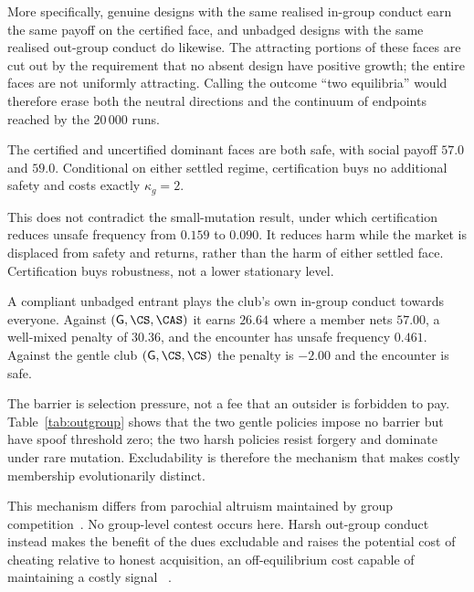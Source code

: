 More specifically, genuine designs with the same realised in-group conduct
earn the same payoff on the certified face, and unbadged designs with the same
realised out-group conduct do likewise. The attracting portions of these faces
are cut out by the requirement that no absent design have positive growth;
the entire faces are not uniformly attracting. Calling the outcome ``two
equilibria'' would therefore erase both the neutral directions and the
continuum of endpoints reached by the $20\,000$ runs.

\begin{corollary}
\label{cor:dues}
The certified and uncertified dominant faces are both safe, with social payoff
$57.0$ and $59.0$. Conditional on either settled regime, certification buys no
additional safety and costs exactly $\kappa_g=2$.
\end{corollary}

This does not contradict the small-mutation result, under which certification
reduces unsafe frequency from $0.159$ to $0.090$. It reduces harm while the
market is displaced from safety and returns, rather than the harm of either
settled face. Certification buys robustness, not a lower stationary level.

\begin{proposition}
\label{prop:exclusion}
A compliant unbadged entrant plays the club's own in-group conduct towards
everyone. Against $(\mathsf{G},\CS,\CAS)$ it earns $26.64$ where a member nets
$57.00$, a well-mixed penalty of $30.36$, and the encounter has unsafe
frequency $0.461$. Against the gentle club $(\mathsf{G},\CS,\CS)$ the penalty
is $-2.00$ and the encounter is safe.
\end{proposition}

The barrier is selection pressure, not a fee that an outsider is forbidden to
pay. Table~\ref{tab:outgroup} shows that the two gentle policies impose no
barrier but have spoof threshold zero; the two harsh policies resist forgery
and dominate under rare mutation. Excludability is therefore the mechanism
that makes costly membership evolutionarily distinct.

This mechanism differs from parochial altruism maintained by group
competition~\citep{choi2007parochial}. No group-level contest occurs here.
Harsh out-group conduct instead makes the benefit of the dues excludable and
raises the potential cost of cheating relative to honest acquisition, an
off-equilibrium cost capable of maintaining a costly signal
~\citep{szamado2011cost}.

